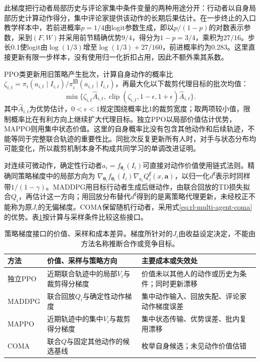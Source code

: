 此梯度把行动者局部历史与评论家集中条件变量的两种用途分开：行动者以自身局部历史计算动作得分，集中评论家提供该动作的长期后果估计。在一步终止的入口教学样本中，若前进概率$p=1/4$由logit参数生成，即以$p/(1-p)$的对数表示参数，采到$(F,W)$并采用前节精确优势$9/4$，得分为$1-p=3/4$，乘积为$27/16$。步长0.1使logit由$\log(1/3)$增至$\log(1/3)+27/160$，前进概率约为0.283。这里直接更新有限一步样本，没有使用归一化折扣占用，因此不额外乘其系数。

PPO类更新用旧策略产生批次，计算自身动作的概率比$\zeta_{i,t}=\pi_i(a_{i,t}\mid I_{i,t})/
\pi_i^{\text{旧}}(a_{i,t}\mid I_{i,t})$，再最大化以下裁剪代理目标的批次均值：
\[
 \min\{\zeta_{i,t}\widehat A_{i,t},
       \operatorname{clip}(\zeta_{i,t},1-\epsilon,1+\epsilon)
                      \widehat A_{i,t}\}.
\]
其中$\widehat A_{i,t}$为优势估计，$0<\epsilon<1$规定围绕概率比1的裁剪宽度；取两项较小值，限制概率比在有利方向上继续扩大代理目标。独立PPO以局部价值估计优势，MAPPO则用集中状态价值。这里的自身概率比没有包含其他动作和后续轨迹，不能等同于完整联合轨迹的重要性比。同批次反复更新所有人时，对手与状态分布均可能变化，所以裁剪机制本身不构成共同学习的单调改进证明。

对连续可微动作，确定性行动者$a_i=f_{\bm\theta_i}(I_i)$可直接对动作价值使用链式法则。精确同策略梯度中的局部方向为
$\nabla_{\bm\theta_i}f_{\bm\theta_i}(I_i)\nabla_{a_i}Q_i^{\bm f}(x,\bm a)$，以归一化$d^{\bm f}$表示时同样带$1/(1-\gamma)$。MADDPG用目标行动者生成后继动作，由联合回放的TD损失拟合$Q_i$，再估计这一方向；用回放分布替代$d^{\bm f}$得到的是离策略代理更新，未经校正不能称为原$J_i$的无偏梯度。COMA保留随机行动者，采用式\eqref{eq:rl-multi-agent-coma}的优势。表\ref{tab:rl-multi-agent-policy-updates}按计算与采样条件比较这些接口。

\begin{table}[htbp]
 \centering
 \begin{tabularx}{\linewidth}{@{}l >{\raggedright\arraybackslash}X >{\raggedright\arraybackslash}X@{}}
 \toprule
 方法 & 价值、采样与策略方向 & 主要成本或失效处\\
 \midrule
 独立PPO & 近期联合轨迹中的局部$V_i$与裁剪得分梯度 & 价值未以其他人的动作或历史为条件；同时更新漂移\\
 MADDPG & 联合回放$Q_i$与确定性动作梯度 & 集中动作输入、回放失配、评论家动作梯度误差\\
 MAPPO & 近期轨迹中的集中$V_i$与裁剪得分梯度 & 集中状态传输、优势误差、批内复用漂移\\
 COMA & 联合$Q$与固定其他动作的候选基线 & 枚举自身候选；未见动作价值估错\\
 \bottomrule
 \end{tabularx}
 \caption{策略梯度接口的价值、采样和成本差异。梯度所针对的$J_i$由收益设定决定，不能由方法名称推断合作或竞争目标。}
 \label{tab:rl-multi-agent-policy-updates}
\end{table}

